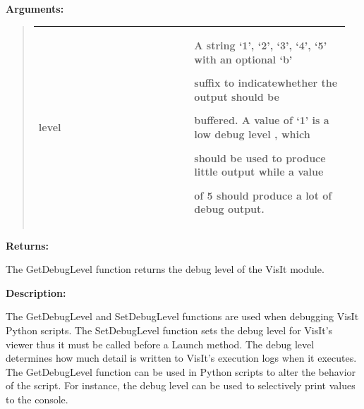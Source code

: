 \documentclass[letterpaper,10pt,english]{sphinxmanual}
\begin{document}
\begin{DUlineblock}{0em}
\item[] 
\item[] \textbf{Arguments:}
\end{DUlineblock}
\begin{quote}

\begin{tabular}{|p{0.475\linewidth}|p{0.475\linewidth}|}
\hline

level
 & 
\begin{DUlineblock}{0em}
\item[] A string `1', `2', `3', `4', `5' with an optional `b'
\item[] suffix to indicatewhether the output should be
\item[] buffered. A value of `1' is a low debug level , which
\item[] should be used to produce little output while a value
\item[] of 5 should produce a lot of debug output.
\end{DUlineblock}
\\
\hline\end{tabular}

\end{quote}

\begin{DUlineblock}{0em}
\item[] 
\item[] \textbf{Returns:}
\item[] The GetDebugLevel function returns the debug level of the VisIt module.
\item[] 
\item[] \textbf{Description:}
\item[] The GetDebugLevel and SetDebugLevel functions are used when debugging
VisIt Python scripts. The SetDebugLevel function sets the debug level for
VisIt's viewer thus it must be called before a Launch method. The debug
level determines how much detail is written to VisIt's execution logs when
it executes. The GetDebugLevel function can be used in Python scripts to
alter the behavior of the script. For instance, the debug level can be used
to selectively print values to the console.
\end{DUlineblock}

\begin{DUlineblock}{0em}
\item[] 
\end{DUlineblock}
\end{document}
